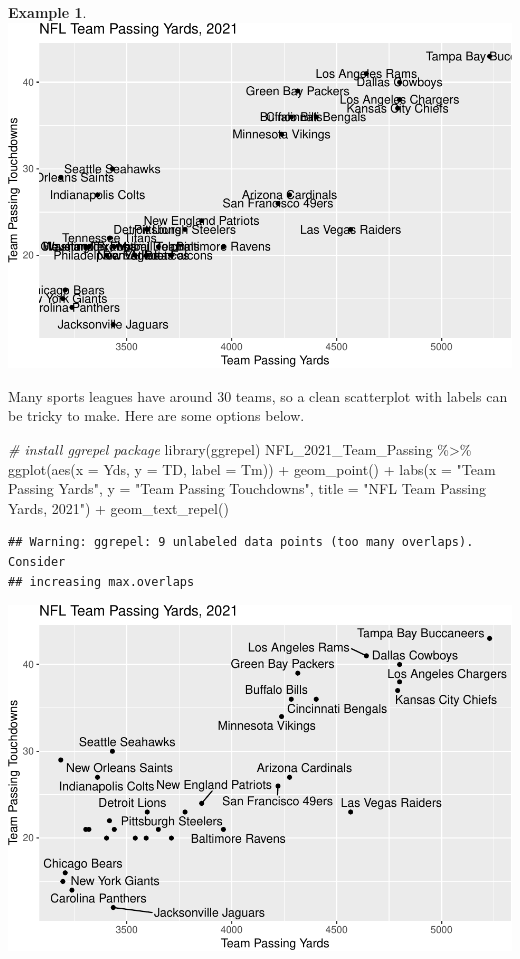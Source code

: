 \documentclass[
  11pt,
]{book}
\newenvironment{Shaded}{\begin{snugshade}}{\end{snugshade}}
\newcommand{\AttributeTok}[1]{\textcolor[rgb]{0.77,0.63,0.00}{#1}}
\newcommand{\CommentTok}[1]{\textcolor[rgb]{0.56,0.35,0.01}{\textit{#1}}}
\newcommand{\FunctionTok}[1]{\textcolor[rgb]{0.00,0.00,0.00}{#1}}
\newcommand{\NormalTok}[1]{#1}
\newcommand{\SpecialCharTok}[1]{\textcolor[rgb]{0.00,0.00,0.00}{#1}}
\newcommand{\StringTok}[1]{\textcolor[rgb]{0.31,0.60,0.02}{#1}}
\theoremstyle{definition}
\theoremstyle{definition}
\newtheorem{example}{Example}[chapter]
\theoremstyle{definition}
\theoremstyle{definition}
\theoremstyle{remark}
\begin{document}
\begin{example}
\includegraphics{series_files/figure-latex/scatter2-1.pdf}

Many sports leagues have around 30 teams, so a clean scatterplot with labels can be tricky to make. Here are some options below.

\begin{Shaded}
\begin{Highlighting}[]
\CommentTok{\# install ggrepel package}
\FunctionTok{library}\NormalTok{(ggrepel)}
\NormalTok{NFL\_2021\_Team\_Passing }\SpecialCharTok{\%\textgreater{}\%}
    \FunctionTok{ggplot}\NormalTok{(}\FunctionTok{aes}\NormalTok{(}\AttributeTok{x =}\NormalTok{ Yds, }\AttributeTok{y =}\NormalTok{ TD, }\AttributeTok{label =}\NormalTok{ Tm)) }\SpecialCharTok{+} \FunctionTok{geom\_point}\NormalTok{() }\SpecialCharTok{+} \FunctionTok{labs}\NormalTok{(}\AttributeTok{x =} \StringTok{"Team Passing Yards"}\NormalTok{,}
    \AttributeTok{y =} \StringTok{"Team Passing Touchdowns"}\NormalTok{, }\AttributeTok{title =} \StringTok{"NFL Team Passing Yards, 2021"}\NormalTok{) }\SpecialCharTok{+} \FunctionTok{geom\_text\_repel}\NormalTok{()}
\end{Highlighting}
\end{Shaded}

\begin{verbatim}
## Warning: ggrepel: 9 unlabeled data points (too many overlaps). Consider
## increasing max.overlaps
\end{verbatim}

\includegraphics{series_files/figure-latex/scatter3-1.pdf}


\end{example}
\end{document}
